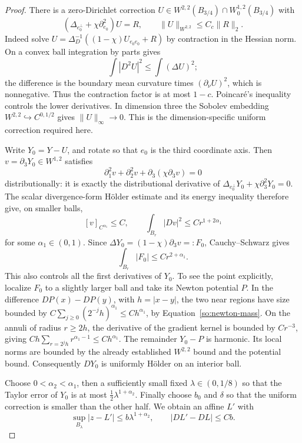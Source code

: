 \begin{proof}
There is a zero-Dirichlet correction $U\in W^{2,2}(B_{3/4})\cap
W^{1,2}_0(B_{3/4})$ with
\[
 (\Delta_{e_0^\perp}+\chi\partial_{e_0}^2)U=R,
 \qquad \|U\|_{W^{2,2}}\le C_c\|R\|_2.
\]
Indeed solve $U=\Delta_D^{-1}((1-\chi)U_{e_0e_0}+R)$ by contraction
in the Hessian norm.  On a convex ball integration by parts gives
\[
 \int |D^2U|^2\le\int(\Delta U)^2;
\]
the difference is the boundary mean curvature times $(\partial_\nu U)^2$,
which is nonnegative.  Thus the contraction factor is at most $1-c$.
Poincar\'e's inequality controls the lower derivatives.  In dimension
three the Sobolev embedding $W^{2,2}\hookrightarrow C^{0,1/2}$ gives
$\|U\|_\infty\to0$.  This is the dimension-specific uniform correction
required here.

Write $Y_0=Y-U$, and rotate so that $e_0$ is the third coordinate axis.
Then $v=\partial_3Y_0\in W^{1,2}$ satisfies
\begin{equation}\label{so:axial-derivative}
 \partial_1^2v+\partial_2^2v+\partial_3(\chi\partial_3v)=0
\end{equation}
distributionally: it is exactly the distributional derivative of
$\Delta_{e_0^\perp}Y_0+\chi\partial_3^2Y_0=0$.
The scalar divergence-form H\"older estimate
\cite[Chapter 8]{GilbargTrudinger2001} and its energy inequality
therefore give, on smaller balls,
\[
 [v]_{C^{\alpha_1}}\le C,\qquad
 \int_{B_r}|Dv|^2\le Cr^{1+2\alpha_1}
\]
for some $\alpha_1\in(0,1)$.  Since
$\Delta Y_0=(1-\chi)\partial_3v=:F_0$, Cauchy--Schwarz gives
\begin{equation}\label{so:newton-mass}
 \int_{B_r}|F_0|\le Cr^{2+\alpha_1}.
\end{equation}
This also controls all the first derivatives of $Y_0$.  To see the
point explicitly, localize $F_0$ to a slightly larger ball and take its
Newton potential $P$.  In the difference $DP(x)-DP(y)$, with
$h=|x-y|$, the two near regions have size bounded by
$C\sum_{j\ge0}(2^{-j}h)^{\alpha_1}\le Ch^{\alpha_1}$, by
Equation~\ref{so:newton-mass}.  On the annuli of radius $r\ge2h$,
the derivative of the gradient kernel is bounded by $Cr^{-3}$, giving
$Ch\sum_{r=2^jh}r^{\alpha_1-1}\le Ch^{\alpha_1}$.
The remainder $Y_0-P$ is harmonic.  Its local norms are bounded by the
already established $W^{2,2}$ bound and the potential bound.  Consequently
$DY_0$ is uniformly H\"older on an interior ball.

Choose $0<\alpha_2<\alpha_1$, then a sufficiently small fixed
$\lambda\in(0,1/8)$ so that the Taylor error of $Y_0$ is at most
$\frac12\lambda^{1+\alpha_2}$.  Finally choose $b_0$ and $\delta$ so
that the uniform correction is smaller than the other half.  We obtain
an affine $L'$ with
\begin{equation}\label{so:affine-improvement}
 \sup_{B_\lambda}|z-L'|\le b\lambda^{1+\alpha_2},
 \qquad |DL'-DL|\le Cb.
\end{equation}


\end{proof}
